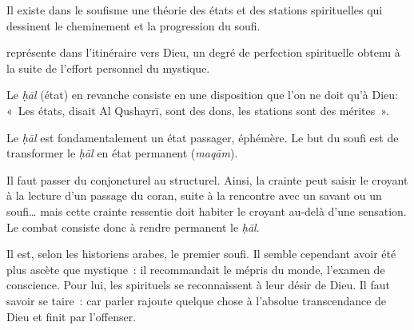 
Il existe dans le soufisme une théorie des états et des stations
spirituelles qui dessinent le cheminement et la progression du soufi.
\begin{Def}
représente dans l'itinéraire vers Dieu, un
degré de perfection spirituelle obtenu à la suite de l'effort personnel
du mystique.
\end{Def}

 Le \emph{ḥāl} (état) en revanche consiste en une
disposition que l'on ne doit qu'à Dieu: «~Les états, disait Al Qushayrī,
sont des dons, les stations sont des mérites~».
\begin{Def}
Le \emph{ḥāl} est fondamentalement un état passager, éphémère. Le but du
soufi est de transformer le \emph{ḥāl} en état permanent (\emph{maqām}).

\end{Def}
Il faut passer du conjoncturel au structurel. Ainsi, la crainte peut
saisir le croyant à la lecture d'un passage du coran, suite à la
rencontre avec un savant ou un soufi\ldots{} mais cette crainte
ressentie doit habiter le croyant au-delà d'une sensation. Le combat
consiste donc à rendre permanent le \emph{ḥāl}.



Il est, selon les historiens arabes, le premier soufi. Il semble
cependant avoir été plus ascète que mystique~: il recommandait le mépris
du monde, l'examen de conscience. Pour lui, les spirituels se
reconnaissent à leur désir de Dieu. Il faut savoir se taire~: car parler
rajoute quelque chose à l'absolue transcendance de Dieu et finit par
l'offenser.

